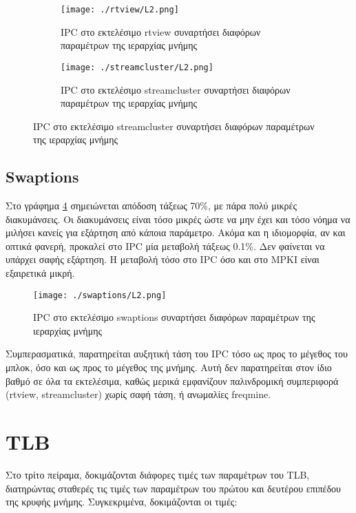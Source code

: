 \documentclass{article}
\newcommand{\eng}[1]{\foreignlanguage{english}{#1}}
\begin{document}
\begin{figure}[h]
    \centering
    \begin{subfigure}{0.6\textwidth}
        \texttt{[image: ./rtview/L2.png]} 
        \caption{\eng{IPC} στο εκτελέσιμο \eng{rtview} συναρτήσει διαφόρων παραμέτρων της ιεραρχίας μνήμης}
        \label{fig:exp2-rtview}
    \end{subfigure}
    \begin{subfigure}{0.6\textwidth}
        \texttt{[image: ./streamcluster/L2.png]} 
        \caption{\eng{IPC} στο εκτελέσιμο \eng{streamcluster} συναρτήσει διαφόρων παραμέτρων της ιεραρχίας μνήμης}
        \label{fig:exp2-streamcluster}
    \end{subfigure}
\end{figure}
\FloatBarrier

\clearpage
\subsection{\eng{Swaptions}}

Στο γράφημα \ref{fig:exp2-swaptions} σημειώνεται απόδοση τάξεως 70\%, με πάρα πολύ μικρές διακυμάνσεις. Οι διακυμάνσεις είναι τόσο μικρές ώστε να μην έχει και τόσο νόημα να μιλήσει κανείς για εξάρτηση από κάποια παράμετρο. Ακόμα και η ιδιομορφία, αν και οπτικά φανερή, προκαλεί στο \eng{IPC} μία μεταβολή τάξεως 0.1\%. Δεν φαίνεται να υπάρχει σαφής εξάρτηση. Η μεταβολή τόσο στο \eng{IPC} όσο και στο \eng{MPKI} είναι εξαιρετικά μικρή.

\begin{figure}[h]
    \centering
    \texttt{[image: ./swaptions/L2.png]} 
    \caption{\eng{IPC} στο εκτελέσιμο \eng{swaptions} συναρτήσει διαφόρων παραμέτρων της ιεραρχίας μνήμης}
    \label{fig:exp2-swaptions}
\end{figure}
\FloatBarrier

Συμπερασματικά, παρατηρείται αυξητική τάση του \eng{IPC} τόσο ως προς το μέγεθος του μπλοκ, όσο και ως προς το μέγεθος της μνήμης. Αυτή δεν παρατηρείται στον ίδιο βαθμό σε όλα τα εκτελέσιμα, καθώς μερικά εμφανίζουν παλινδρομική συμπεριφορά (\eng{rtview, streamcluster}) χωρίς σαφή τάση, ή ανωμαλίες \eng{freqmine}.


\clearpage
\section{\eng{TLB}}

Στο τρίτο πείραμα, δοκιμάζονται διάφορες τιμές των παραμέτρων του \eng{TLB}, διατηρώντας σταθερές τις τιμές των παραμέτρων του πρώτου και δευτέρου επιπέδου της κρυφής μνήμης. Συγκεκριμένα, δοκιμάζονται οι τιμές:
\end{document}

